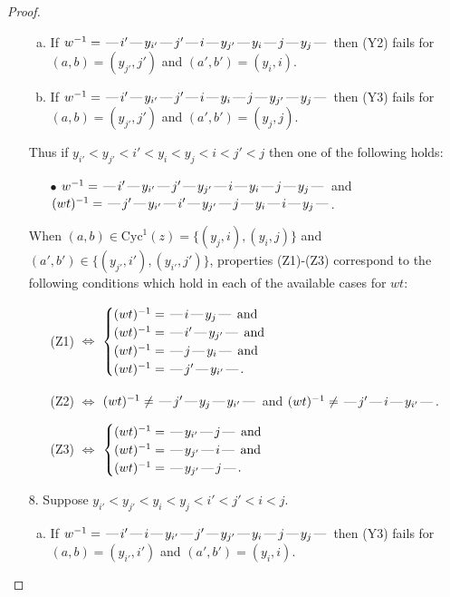 \documentclass[10pt]{article}
\theoremstyle{definition}
\theoremstyle{definition}
\def\dash{\text{\hspace{0.5mm}---\hspace{0.5mm}}}
\def\Cyc{\mathrm{Cyc}}
\begin{document}
\begin{proof}
\begin{enumerate}
\begin{enumerate}[(a)]
\item If $w^{-1} = \dash i'\dash y_{i'}\dash j'\dash i\dash y_{j'}\dash y_i\dash j\dash y_j\dash $ then (Y2) fails for $(a,b)=(y_{j'},j')$ and $(a',b')=(y_i,i)$.
\item If $w^{-1} = \dash i'\dash y_{i'}\dash j'\dash i\dash y_i\dash j\dash y_{j'}\dash y_j\dash $ then (Y3) fails for $(a,b)=(y_{j'},j')$ and $(a',b')=(y_j,j)$.
\end{enumerate}
Thus if $y_{i'} < y_{j'} < i' < y_i < y_j < i < j' < j$ then one of the following holds:
\begin{enumerate}
\item[$\bullet$] $w^{-1} = \dash i'\dash y_{i'}\dash j'\dash y_{j'}\dash i\dash y_i\dash j\dash y_j\dash $ and $(wt)^{-1} = \dash j'\dash y_{i'}\dash i'\dash y_{j'}\dash j\dash y_i\dash i\dash y_j\dash $.
\end{enumerate}
When $(a,b)\in\Cyc^1(z)=\{(y_j,i),(y_i,j)\}$ and $(a',b')\in\{(y_{j'},i'),(y_{i'},j')\}$,
properties (Z1)-(Z3) correspond to the following conditions which
hold in each of the available cases for $wt$:
\begin{enumerate}
\item[](Z1) $\Leftrightarrow$ $\begin{cases}\text{$(wt)^{-1} = \dash i \dash y_j \dash$}\text{ and }\\
\text{$(wt)^{-1} = \dash i' \dash y_{j'} \dash$}\text{ and }\\
\text{$(wt)^{-1} = \dash j \dash y_i \dash$}\text{ and }\\
\text{$(wt)^{-1} = \dash j' \dash y_{i'} \dash$}.\end{cases}$
\item[](Z2) $\Leftrightarrow$ $(wt)^{-1} \neq \dash j' \dash y_j \dash y_{i'} \dash$ and $(wt)^{-1}\neq \dash j' \dash i \dash y_{i'} \dash$.
\item[](Z3) $\Leftrightarrow$ $\begin{cases}\text{$(wt)^{-1} = \dash y_{i'} \dash j \dash$}\text{ and }\\
\text{$(wt)^{-1} = \dash y_{j'} \dash i \dash$}\text{ and }\\
\text{$(wt)^{-1} = \dash y_{j'} \dash j \dash$}.\end{cases}$
\end{enumerate}
\item[$8$.] Suppose $y_{i'} < y_{j'} < y_i < y_j < i' < j' < i < j$.
\begin{enumerate}[(a)]
\item If $w^{-1} = \dash i'\dash i\dash y_{i'}\dash j'\dash y_{j'}\dash y_i\dash j\dash y_j\dash $ then (Y3) fails for $(a,b)=(y_{i'},i')$ and $(a',b')=(y_i,i)$.

\end{enumerate}
\end{enumerate}
\end{proof}
\end{document}
